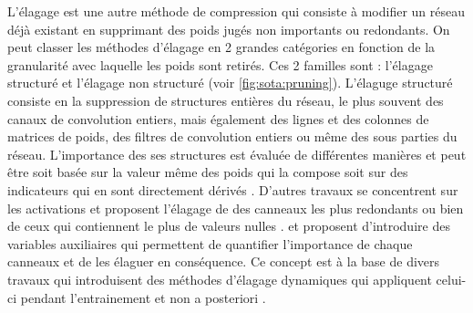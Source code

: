 L'élagage est une autre méthode de compression qui consiste à modifier un réseau
déjà existant en supprimant des poids jugés non importants ou redondants. On
peut classer les méthodes d'élagage en 2 grandes catégories en fonction de la
granularité avec laquelle les poids sont retirés. Ces 2 familles sont :
l'élagage structuré et l'élagage non structuré (voir \cref{fig:sota:pruning}).
L'élaguge structuré consiste en la suppression de structures entières du
réseau, le plus souvent des canaux de convolution entiers, mais également des
lignes et des colonnes de matrices de poids, des filtres de convolution entiers
ou même des sous parties du réseau. L'importance des ses structures est évaluée
de différentes manières et peut être soit basée sur la valeur même des poids qui
la compose \cite{DBLP:conf/iclr/0022KDSG17} soit sur des indicateurs qui en sont
directement dérivés \cite{DBLP:conf/cvpr/HeLWHY19,DBLP:conf/cvpr/WangLW21}.
D'autres travaux se concentrent sur les activations et proposent l'élagage de
des canneaux les plus redondants \cite{DBLP:conf/iccv/HeZS17} ou bien de ceux
qui contiennent le plus de valeurs nulles \cite{DBLP:journals/corr/HuPTT16}.
\cite{DBLP:conf/iccv/LiuLSHYZ17} et \cite{DBLP:conf/nips/YouYYM019} proposent
d'introduire des variables auxiliaires qui permettent de quantifier l'importance
de chaque canneaux et de les élaguer en conséquence. Ce concept est à la base de
divers travaux qui introduisent des méthodes d'élagage dynamiques qui
appliquent celui-ci pendant l'entrainement et non a posteriori
\cite{DBLP:conf/nips/GuoYC16,DBLP:conf/ijcai/HeKDFY18}.\\

